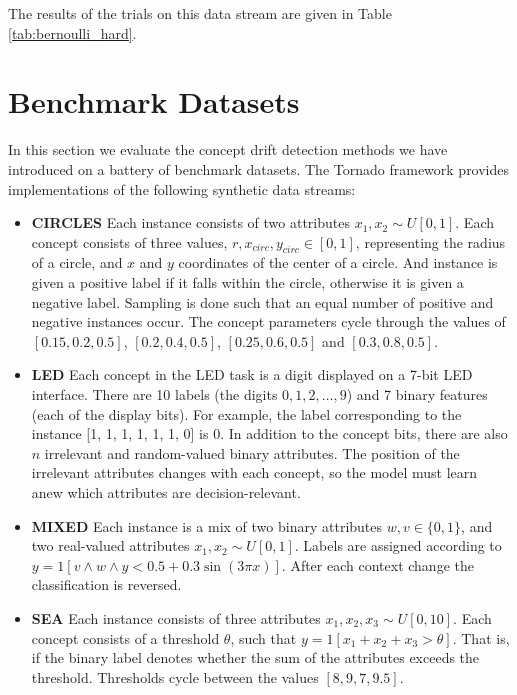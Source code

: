 The results of the trials on this data stream are given in Table \ref{tab:bernoulli_hard}.


\section{Benchmark Datasets} \label{Experiments:benchmark}

In this section we evaluate the concept drift detection methods we have introduced on a battery of benchmark datasets. The Tornado framework provides implementations of the following synthetic data streams:
\begin{itemize}
    \item {\bf CIRCLES} Each instance consists of two attributes $x_1,x_2\sim U[0,1]$. Each concept consists of three values, $r,x_{circ},y_{circ}\in[0,1]$, representing the radius of a circle, and $x$ and $y$ coordinates of the center of a circle. And instance is given a positive label if it falls within the circle, otherwise it is given a negative label. Sampling is done such that an equal number of positive and negative instances occur. The concept parameters cycle through the values of $[0.15, 0.2, 0.5]$, $[0.2, 0.4, 0.5]$, $[0.25, 0.6, 0.5]$ and $[0.3, 0.8, 0.5]$.
    \item {\bf LED} Each concept in the LED task is a digit displayed on a 7-bit LED interface. There are 10 labels (the digits $0,1,2,\dots,9$) and 7 binary features (each of the display bits).  For example, the label corresponding to the instance [1, 1, 1, 1, 1, 1, 0] is $0$. In addition to the concept bits, there are also $n$ irrelevant and random-valued binary attributes. The position of the irrelevant attributes changes with each concept, so the model must learn anew which attributes are decision-relevant. 
    \item {\bf MIXED} Each instance is a mix of two binary attributes $w,v\in\{0,1\}$, and two real-valued attributes $x_1,x_2\sim U[0,1]$. Labels are assigned according to $y=\mathrm{1}[v \wedge w \wedge  y < 0.5 + 0.3 \sin(3\pi x)]$. After each context change the classification is reversed.
    \item {\bf SEA} Each instance consists of three attributes $x_1,x_2,x_3\sim U[0,10]$. Each concept consists of a threshold $\theta$, such that $y=\mathrm{1}[x_1+x_2+x_3 > \theta]$. That is, if the binary label denotes whether the sum of the attributes exceeds the threshold. Thresholds cycle between the values $[8, 9, 7, 9.5]$.

\end{itemize}
